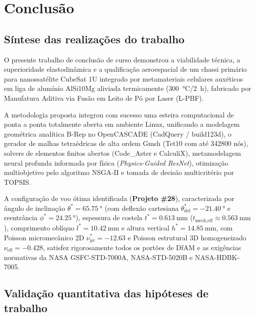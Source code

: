 \chapter{Conclusão}
\label{cap:conclusao}

\section{Síntese das realizações do trabalho}
\label{sec:conc-sintese}

O presente trabalho de conclusão de curso demonstrou a viabilidade técnica, a superioridade elastodinâmica e a qualificação aeroespacial de um chassi primário para nanossatélite CubeSat 1U integrado por metamateriais celulares auxéticos em liga de alumínio AlSi10Mg aliviada termicamente (\SI{300}{\celsius}/\SI{2}{\hour}), fabricado por Manufatura Aditiva via Fusão em Leito de Pó por Laser (L-PBF).

A metodologia proposta integrou com sucesso uma esteira computacional de ponta a ponta totalmente aberta em ambiente Linux, unificando a modelagem geométrica analítica B-Rep no OpenCASCADE (CadQuery / build123d), o gerador de malhas tetraédricas de alta ordem Gmsh (Tet10 com até \num{342800} nós), solvers de elementos finitos abertos (Code\_Aster e CalculiX), metamodelagem neural profunda informada por física (\textit{Physics-Guided ResNet}), otimização multiobjetivo pelo algoritmo NSGA-II e tomada de decisão multicritério por TOPSIS.

A configuração de voo ótima identificada (\textbf{Projeto \#28}), caracterizada por ângulo de inclinação $\theta^* = \SI{65.75}{\degree}$ (com deflexão cartesiana $\theta_{\text{def}}^* = \SI{-21.40}{\degree}$ e reentrância $\phi^* = \SI{24.25}{\degree}$), espessura de costela $t^* = \SI{0.613}{\milli\metre}$ ($t_{\text{mech,eff}} \approx \SI{0.563}{\milli\metre}$), comprimento oblíquo $l^* = \SI{10.42}{\milli\metre}$ e altura vertical $h^* = \SI{14.85}{\milli\metre}$, com Poisson micromecânico 2D $\nu_{yx}^* = \num{-12.63}$ e Poisson estrutural 3D homogeneizado $\nu_{\text{eff}} = \num{-0.428}$, satisfez rigorosamente todos os portões de DfAM e as exigências normativas da NASA GSFC-STD-7000A, NASA-STD-5020B e NASA-HDBK-7005.

\section{Validação quantitativa das hipóteses de trabalho}
\label{sec:conc-hipoteses}

